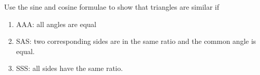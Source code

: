 Use the sine and cosine formulae to show that triangles are similar if 
\renewcommand{\theequation}{\theenumi}
\begin{enumerate}[label=\arabic*.,ref=\thesubsection.\theenumi]

\item
AAA:	all angles are equal

\item
SAS:	two corresponding sides are in the same ratio and the common angle is equal.

\item
SSS:	all sides have the same ratio.

\end{enumerate}

